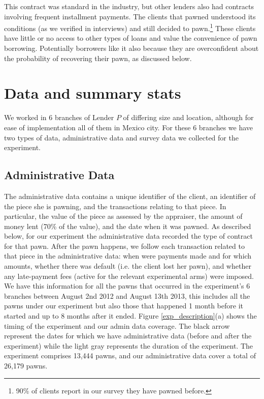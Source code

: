 \documentclass[oneside,11pt]{article}
\begin{document}
This contract was standard in the industry, but other lenders also had contracts involving frequent installment payments. The clients that pawned understood its conditions (as we verified in interviews) and still decided to pawn.\footnote{90\% of clients report in our survey they have pawned before.} These clients have little or no access to other types of loans and value the convenience of pawn borrowing. Potentially borrowers like it also because they are overconfident about the probability of recovering their pawn, as discussed below.

    
\section{Data and summary stats} \label{Data}
    
We worked in 6 branches of Lender $P$ of differing size and location, although for ease of implementation all of them in Mexico city. For these 6 branches we have two types of data, administrative data and survey data we collected for the experiment. 

\subsection{Administrative Data}
The administrative data contains a unique identifier of the client, an identifier of the piece she is pawning, and the transactions relating to that piece. In particular, the value of the piece as assessed by the appraiser, the amount of money lent (70\% of the value), and the date when it was pawned. As described below, for our experiment the administrative data recorded the type of contract for that pawn. After the pawn happens, we follow each transaction related to that piece in the administrative data: when were payments made and for which amounts, whether there was default (i.e. the client lost her pawn), and whether any late-payment fees (active for the relevant experimental arms) were imposed. We have this information for all the pawns that occurred in the experiment's 6 branches between August 2nd 2012 and August 13th 2013, this includes all the pawns under our experiment but also those that happened 1 month before it started and up to 8 months after it ended. Figure \ref{exp_description}(a) shows the timing of the experiment and our admin data coverage. The black arrow represent the dates for which we have administrative data (before and after the experiment) while the light gray represents the duration of the experiment. The experiment comprises 13,444 pawns, and our administrative data cover a total of 26,179 pawns.
\end{document}

